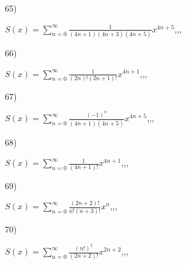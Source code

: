 \documentclass[11pt, ukrainian]{article}
\begin{document}
\par
\newpage
65) \space 
{%
{$S(x)=\sum\limits_{n=0}^{\infty}{\frac{1}{(4n+1)(4n+3)(4n+5)}}{x^{{4n+5}}}$},,, \par \smallskip  
}
\par
\vspace{0.9cm}
66) \space 
{%
{$S(x)=\sum\limits_{n=0}^{\infty}{\frac{1}{(2n)!(2n+1)!}}{x^{{4n+1}}}$},,, \par \smallskip  
}
\par
\vspace{0.9cm}
67) \space 
{%
{$S(x)=\sum\limits_{n=0}^{\infty}{\frac{(-1)^n}{(4n+1)(4n+5)}}{x^{{4n+5}}}$},,, \par \smallskip  
}
\par
\vspace{0.9cm}
68) \space 
{%
{$S(x)=\sum\limits_{n=0}^{\infty}{\frac{1}{(4n+1)!}}{x^{{4n+1}}}$},,, \par \smallskip  
}
\par
\vspace{0.9cm}
69) \space 
{%
{$S(x)=\sum\limits_{n=0}^{\infty}{\frac{(2n+2)!}{n!(n+3)!}}{x^{n}}$},,, \par \smallskip  
}
\par
\vspace{0.9cm}
70) \space 
{%
{$S(x)=\sum\limits_{n=0}^{\infty}{\frac{(n!)^2}{(2n+2)!}}{x^{{2n+2}}}$},,, \par \smallskip  
}
\end{document}
